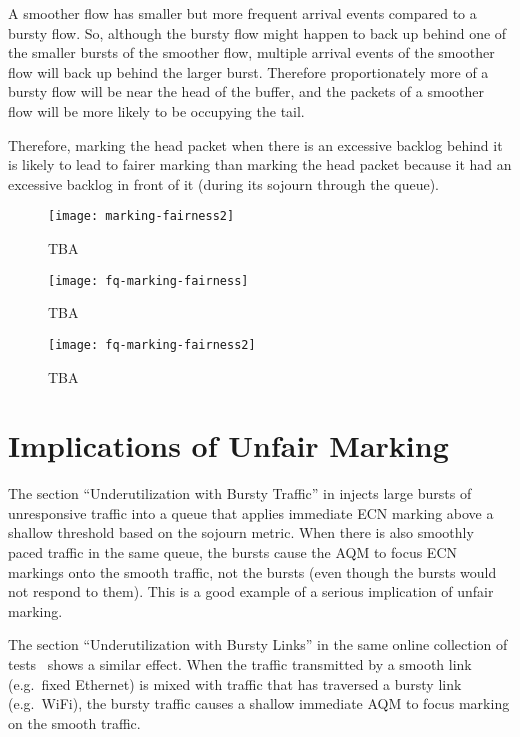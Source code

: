 A smoother flow has smaller but more frequent arrival events compared to a bursty flow. So, although the bursty flow might happen to back up behind one of the smaller bursts of the smoother flow, multiple arrival events of the smoother flow will back up behind the larger burst. Therefore proportionately more of a bursty flow will be near the head of the buffer, and the packets of a smoother flow will be more likely to be occupying the tail.

Therefore, marking the head packet when there is an excessive backlog behind it is likely to lead to fairer marking than marking the head packet because it had an excessive backlog in front of it (during its sojourn through the queue). 

\begin{figure}[h]
	\centering
	\texttt{[image: marking-fairness2]}
	\caption{TBA}\label{fig:marking-fairness2}
\end{figure}

\begin{figure}[h]
	\centering
	\texttt{[image: fq-marking-fairness]}
	\caption{TBA}\label{fig:fq-marking-fairness}
\end{figure}

\begin{figure}[h]
	\centering
	\texttt{[image: fq-marking-fairness2]}
	\caption{TBA}\label{fig:fq-marking-fairness2}
\end{figure}

\section{Implications of Unfair Marking}\label{sec:effects_unfair_marking}

The section ``Underutilization with Bursty Traffic'' in \cite{Heist20:L4S_tests} injects large bursts of unresponsive traffic into a queue that applies immediate ECN marking above a shallow threshold based on the sojourn metric. When there is also smoothly paced traffic in the same queue, the bursts cause the AQM to focus ECN markings onto the smooth traffic, not the bursts (even though the bursts would not respond to them). This is a good example of a serious implication of unfair marking.

The section ``Underutilization with Bursty Links'' in the same online collection of tests~\cite{Heist20:L4S_tests} shows a similar effect. When the traffic transmitted by a smooth link (e.g.\ fixed Ethernet) is mixed with traffic that has traversed a bursty link (e.g.\ WiFi), the bursty traffic causes a shallow immediate AQM to focus marking on the smooth traffic.

